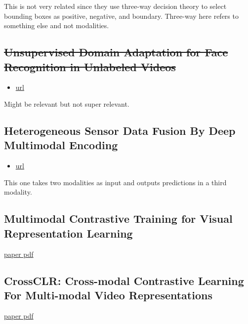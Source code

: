 This is not very related since they use three-way decision theory to select bounding boxes as positive, negative, and boundary.
Three-way here refers to something else and not modalities.

\subsection{\st{Unsupervised Domain Adaptation for Face Recognition in Unlabeled Videos}}
\begin{itemize}
\item \href{https://openaccess.thecvf.com/content\_ICCV\_2017/papers/Sohn\_Unsupervised\_Domain\_Adaptation\_ICCV\_2017\_paper.pdf}{url}
\end{itemize}
Might be relevant but not super relevant.


\subsection{Heterogeneous Sensor Data Fusion By Deep Multimodal Encoding}
\begin{itemize}
\item \href{https://ieeexplore.ieee.org/stamp/stamp.jsp?tp=&arnumber=7874158}{url}
\end{itemize}
This one takes two modalities as input and outputs predictions in a third modality.

\subsection{Multimodal Contrastive Training for Visual Representation Learning}
\href{https://arxiv.org/pdf/2104.12836.pdf}{paper pdf}


\subsection{CrossCLR: Cross-modal Contrastive Learning For Multi-modal Video Representations}
\href{https://openaccess.thecvf.com/content/ICCV2021/papers/Zolfaghari_CrossCLR_Cross-Modal_Contrastive_Learning_for_Multi-Modal_Video_Representations_ICCV_2021_paper.pdf}{paper pdf}


